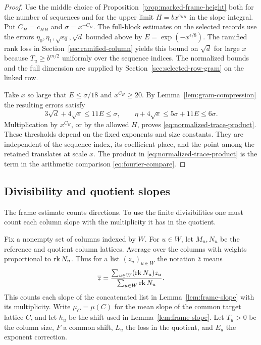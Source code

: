 \begin{proof}
Use the middle choice of Proposition~\ref{prop:marked-frame-height}
both for the number of sequences and for the upper limit
\(H=bx^{c_{HH}}\) in the slope integral. Put
\(C_H=c_{HH}\) and \(\sigma=x^{-C_H}\).
The full-block estimates on the selected
records use the errors \(\eta_0,\eta_1,\sqrt{e_0},\sqrt d\)
bounded above by \(E=\exp(-x^{\epsilon/8})\). The ramified
rank loss in Section~\ref{sec:ramified-column} yields this bound
on \(\sqrt d\) for large \(x\) because \(T_u\ge b^{m/2}\)
uniformly over the sequence indices. The normalized bounds and the full
dimension are supplied by Section~\ref{sec:selected-row-gram}
on the linked row.

Take \(x\) so large
that \(E\le \sigma/18\) and \(x^{C_H}\ge20\).
By Lemma~\ref{lem:gram-compression} the resulting errors satisfy
\[
 3\sqrt d+4\sqrt e\le11E\le\sigma,\qquad
 \eta+4\sqrt e\le5\sigma+11E\le6\sigma .
\]
Multiplication by \(x^{C_H}\), or by the allowed \(H\), proves
\eqref{eq:normalized-trace-product}.
These thresholds depend on the fixed exponents and size
constants. They are independent of the sequence index, its coefficient
place, and the point among the retained translates at scale \(x\).
The product in \eqref{eq:normalized-trace-product} is the
term in the arithmetic comparison \eqref{eq:fourier-compare}.

\end{proof}

\subsection{Divisibility and quotient slopes}

The frame estimate counts directions. To use the finite divisibilities one must count each column slope with the multiplicity it has in the quotient.

Fix a nonempty set of columns indexed by \(W\). For \(u\in W\),
let \(M_u,N_u\) be the reference and quotient column lattices.
Average over the columns with weights proportional to \(\operatorname{rk} N_u\).
Thus for a list \((z_u)_{u\in W}\) the notation \(\overline z\)
means
\[
 \overline z =
 \frac{\sum_{u\in W}(\operatorname{rk} N_u)z_u}{\sum_{u\in W}\operatorname{rk} N_u}.
\]
This counts each slope of the concatenated list in
Lemma~\ref{lem:frame-slope} with its multiplicity. Write \(\mu_C=\mu(C)\)
for the mean slope of the common target lattice \(C\), and
let \(h_u\) be the shift used in Lemma~\ref{lem:frame-slope}.
Let \(T_u>0\) be the column size, \(F\) a common shift,
\(L_u\) the loss in the quotient, and \(E_u\) the exponent
correction.

